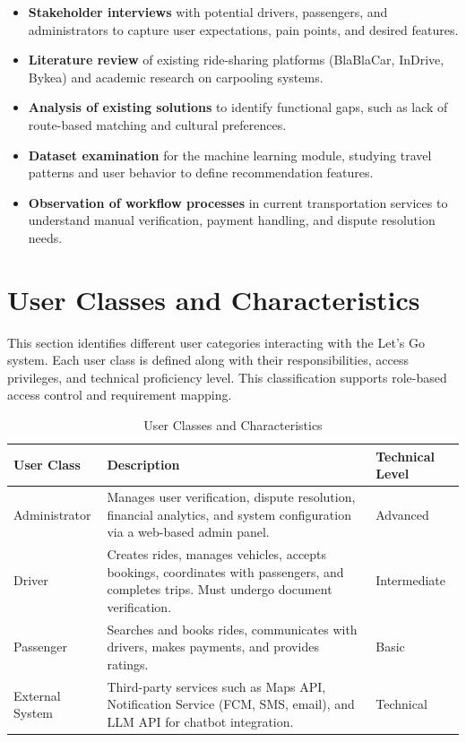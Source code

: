 \begin{itemize}
    \item \textbf{Stakeholder interviews} with potential drivers, passengers, and administrators to capture user expectations, pain points, and desired features.
    \item \textbf{Literature review} of existing ride-sharing platforms (BlaBlaCar, InDrive, Bykea) and academic research on carpooling systems.
    \item \textbf{Analysis of existing solutions} to identify functional gaps, such as lack of route-based matching and cultural preferences.
    \item \textbf{Dataset examination} for the machine learning module, studying travel patterns and user behavior to define recommendation features.
    \item \textbf{Observation of workflow processes} in current transportation services to understand manual verification, payment handling, and dispute resolution needs.
\end{itemize}

\section{User Classes and Characteristics}

This section identifies different user categories interacting with the Let's Go system. Each user class is defined along with their responsibilities, access privileges, and technical proficiency level. This classification supports role-based access control and requirement mapping.

\begin{table}[htbp]
\centering
\caption{User Classes and Characteristics}
\begin{tabularx}{\textwidth}{|p{3cm}|X|p{3cm}|}
\hline
\rowcolor{lightgray!30}
\textbf{User Class} & \textbf{Description} & \textbf{Technical Level} \\
\hline
Administrator & Manages user verification, dispute resolution, financial analytics, and system configuration via a web-based admin panel. & Advanced \\
\hline
Driver & Creates rides, manages vehicles, accepts bookings, coordinates with passengers, and completes trips. Must undergo document verification. & Intermediate \\
\hline
Passenger & Searches and books rides, communicates with drivers, makes payments, and provides ratings. & Basic \\
\hline
External System & Third-party services such as Maps API, Notification Service (FCM, SMS, email), and LLM API for chatbot integration. & Technical \\
\hline
\end{tabularx}
\end{table}

